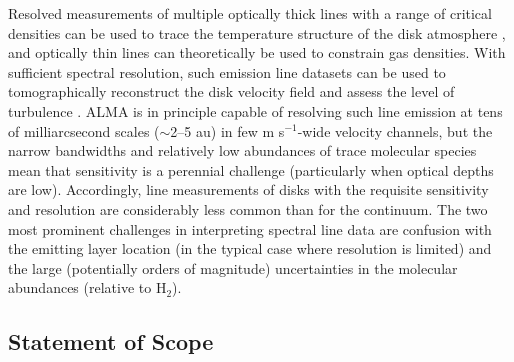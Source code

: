 \documentclass[a4paper]{ar-1col}
\begin{document}
Resolved measurements of multiple optically thick lines with a range of critical densities can be used to trace the temperature structure of the disk atmosphere \citep[e.g.,][]{dartois03}, and optically thin lines can theoretically be used to constrain gas densities.  With sufficient spectral resolution, such emission line datasets can be used to tomographically reconstruct the disk velocity field \citep{simon00,rosenfeld13a} and assess the level of turbulence \citep{guilloteau12,flaherty15}.  ALMA is in principle capable of resolving such line emission at tens of milliarcsecond scales ($\sim$2--5 au) in few m s$^{-1}$-wide velocity channels, but the narrow bandwidths and relatively low abundances of trace molecular species mean that sensitivity is a perennial challenge (particularly when optical depths are low).  Accordingly, line measurements of disks with the requisite sensitivity and resolution are considerably less common than for the continuum.  The two most prominent challenges in interpreting spectral line data are confusion with the emitting layer location (in the typical case where resolution is limited) and the large (potentially orders of magnitude) uncertainties in the molecular abundances (relative to H$_2$).         




\subsection{Statement of Scope} \label{sec:scope}
\end{document}
